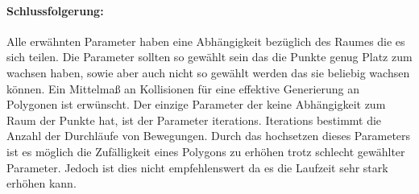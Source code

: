 \paragraph{Schlussfolgerung:}
Alle erwähnten Parameter haben eine Abhängigkeit bezüglich des Raumes die es sich teilen. Die Parameter sollten so gewählt sein das die Punkte genug Platz zum wachsen haben, sowie aber auch nicht so gewählt werden das sie beliebig wachsen können. Ein Mittelmaß an Kollisionen für eine effektive Generierung an Polygonen ist erwünscht.
Der einzige Parameter der keine Abhängigkeit zum Raum der Punkte hat, ist der Parameter iterations. Iterations bestimmt die Anzahl der Durchläufe von Bewegungen. Durch das hochsetzen dieses Parameters ist es möglich die Zufälligkeit eines Polygons zu erhöhen trotz schlecht gewählter Parameter. Jedoch ist dies nicht empfehlenswert da es die Laufzeit sehr stark erhöhen kann.  

	

